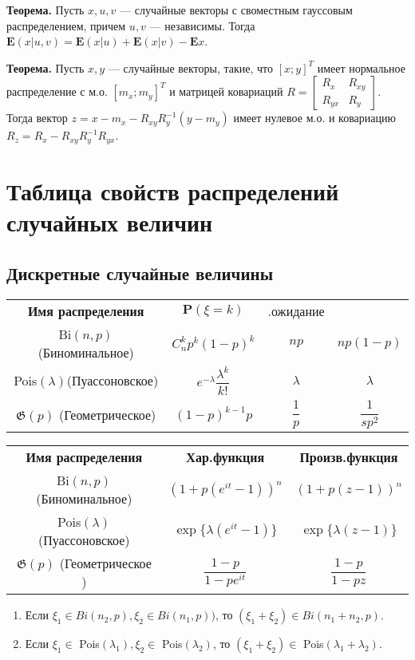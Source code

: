 \documentclass[a4paper,12pt]{scrartcl}
\newcommand{\E}{\mathbf{E}}
\begin{document}
\textbf{Теорема.} Пусть $x,u,v$ ---  случайные векторы с своместным гауссовым распределением, причем $u,v$ --- независимы. Тогда $\E(x|u,v) = \E(x|u)+\E(x|v)-\E x$.

\textbf{Теорема.} Пусть $x,y$ --- случайные векторы, такие, что $[x; y]^T$ имеет нормальное распределение с м.о. $[m_x; m_y]^T$ и матрицей ковариаций $R = \begin{bmatrix} R_x & R_{xy}\\ R_{yx} & R_y \end{bmatrix}$. Тогда вектор $z = x - m_x - R_{xy}R_y^{-1}(y-m_y)$ имеет нулевое м.о.  и ковариацию $R_z = R_x-R_{xy}R_y^{-1}R_{yx}$.
\section{Таблица свойств распределений случайных величин}
\subsection{Дискретные случайные величины}
\begin{tabular}{|c|c|c|c|}
{\bfseries Имя распределения} & $\mathbf P(\xi = k)$ & {.ожидание}&{}\\
\hfill
Bi$(n,p)$(Биноминальное) & $C_n^kp^k(1-p)^k$ & $np$ & $np(1-p)$\\
Pois$(\lambda)$(Пуассоновское) & $e^{-\lambda}\dfrac{\lambda^k}{k!}$ & $\lambda$&$\lambda$\\
$\mathfrak{G}(p)$ (Геометрическое)& $(1-p)^{k-1}p$& $\dfrac{1}{p}$ & $\dfrac{1}{sp^2}$ \\
\end{tabular}

\begin{tabular}{|c|c|c|}
{\bfseries Имя распределения} & \bfseries{Хар.функция}&{\bfseries Произв.функция}\\
Bi$(n,p)$(Биноминальное) & $(1+p(e^{it}-1))^n$ & $(1+p(z-1))^n$ \\

Pois$(\lambda)$(Пуассоновское) & $ \exp\{\lambda(e^{it}-1)\}$&$\exp\{\lambda(z-1)\}$ \\
$\mathfrak{G}(p)$ (Геометрическое )& $\dfrac{1-p}{1-pe^{it}}$& $\dfrac{1-p}{1-pz}$\\
\end{tabular}
\begin{enumerate}
\item Если $\xi_1 \in Bi(n_2,p),\xi_2 \in Bi(n_1,p))$, то $(\xi_1+\xi_2) \in Bi(n_1+n_2,p)$.
\item Если $\xi_1 \in$ Pois$(\lambda_1),\xi_2 \in $ Pois$(\lambda_2)$, то $(\xi_1+\xi_2) \in $ Pois$(\lambda_1 + \lambda_2)$.
\end{enumerate}
\end{document}
